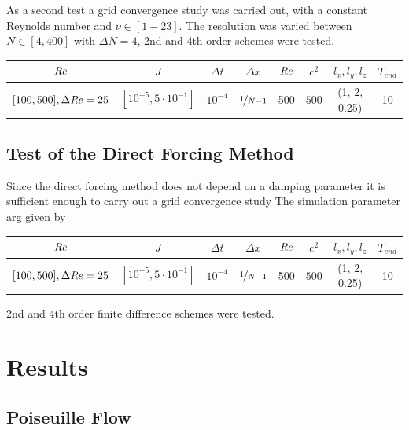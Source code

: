As a second test a grid convergence study was carried out, with a constant Reynolds number and $\nu \in [1-23]$.
The resolution was varied between $N\in [4, 400]$ with $\Delta N = 4$, 2nd and 4th order schemes were tested.

\begin{center}
\vspace*{0.7ex}
\begin{tabular}{c|c|c|c|c|c|c|c }
 $ \mbox{\textit{Re}}  $                      & $J$ &  $\Delta t$ & $\Delta x$            & $\mbox{\textit{Re}}$  & $c^2$   & $l_x, l_y, l_z$ & $T_{end}$\\
\hline
 $[100, 500], \Delta \mbox{\textit{Re}} = 25 $& $[10^{-5}, 5\cdot10^{-1}]  $ &  $10^{-4}$ & $\nicefrac{1}{N - 1}$ & 500     & $500$   & (1, 2, 0.25)  & 10\\
\end{tabular}
\vspace*{0.7ex}
\end{center}

\subsection{Test of the Direct Forcing Method}

Since the direct forcing method does not depend on a damping parameter it is sufficient enough
to carry out a grid convergence study
The simulation parameter arg given by

\begin{center}
\vspace*{0.7ex}
\begin{tabular}{c|c|c|c|c|c|c|c }
 $ \mbox{\textit{Re}}  $                      & $J$ &  $\Delta t$ & $\Delta x$            & $\mbox{\textit{Re}}$  & $c^2$   & $l_x, l_y, l_z$ & $T_{end}$\\
\hline
 $[100, 500], \Delta \mbox{\textit{Re}} = 25 $& $[10^{-5}, 5\cdot10^{-1}]  $ &  $10^{-4}$ & $\nicefrac{1}{N - 1}$ & 500     & $500$   & (1, 2, 0.25)  & 10\\
\end{tabular}
\vspace*{0.7ex}
\end{center}

2nd and 4th order finite difference schemes were tested.

\clearpage

\section{Results}
\subsection{Poiseuille Flow}
